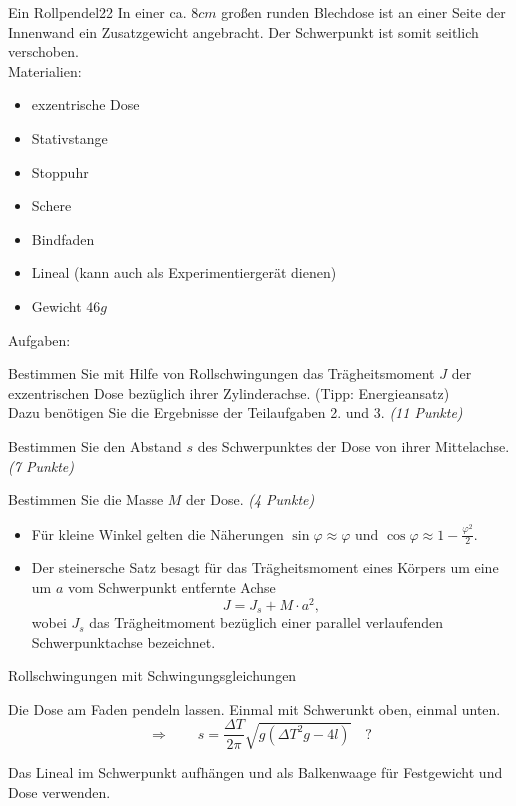 
\begin{problem}{Ein Rollpendel}{22}
In einer ca. $8\unit{cm}$ großen runden Blechdose ist an einer Seite der Innenwand ein Zusatzgewicht angebracht. Der Schwerpunkt ist somit seitlich verschoben.\\
Materialien:
\begin{itemize}
\item exzentrische Dose
\item Stativstange
\item Stoppuhr
\item Schere
\item Bindfaden
\item Lineal (kann auch als Experimentiergerät dienen)
\item Gewicht $46\unit{g}$
\end{itemize}
Aufgaben:
\begin{abcenum}
\item Bestimmen Sie mit Hilfe von Rollschwingungen das Trägheitsmoment $J$ der exzentrischen Dose bezüglich ihrer Zylinderachse. (Tipp: Energieansatz)\\
Dazu benötigen Sie die Ergebnisse der Teilaufgaben 2. und 3. \emph{(11 Punkte)}
\item Bestimmen Sie den Abstand $s$ des Schwerpunktes der Dose von ihrer Mittelachse. \emph{(7 Punkte)}
\item Bestimmen Sie die Masse $M$ der Dose. \emph{(4 Punkte)}
\end{abcenum}
\hinweis
\begin{itemize}
\item Für kleine Winkel gelten die Näherungen $\sin{\varphi}\approx\varphi$ und $\cos{\varphi}\approx1-\frac{\varphi^2}{2}$.
\item Der steinersche Satz besagt für das Trägheitsmoment eines Körpers um eine um $a$ vom Schwerpunkt entfernte Achse
\[
J=J_s+M\cdot a^2,
\]
wobei $J_s$ das Trägheitmoment bezüglich einer parallel verlaufenden Schwerpunktachse bezeichnet.
\end{itemize}
\begin{expsolution}
\begin{abcenum}
\item Rollschwingungen mit Schwingungsgleichungen
\item Die Dose am Faden pendeln lassen. Einmal mit Schwerunkt oben, einmal unten.
\[
\Rightarrow\qquad s=\frac{\Delta T}{2\pi}\sqrt{g\left(\Delta T^2g-4l\right)}\quad?
\]
\item Das Lineal im Schwerpunkt aufhängen und als Balkenwaage für Festgewicht und Dose verwenden.
\end{abcenum}
\end{expsolution}
\end{problem}

